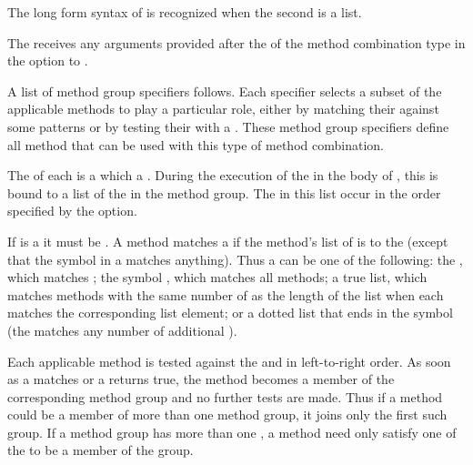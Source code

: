  
The long form syntax of  is recognized 
when the second  is a list.  
 
The  
receives any arguments provided after the  of the method
combination type in the  option to
.
 
A list of method group specifiers follows.  Each specifier selects a subset
of the applicable methods to play a particular role, either by matching
their  against some patterns or by testing their  with
a .   
These method group specifiers define all method 
that can be used with this type of method combination.
 
 
The  of each  is a 
which  a .
During the execution of
the  in the body of , this
 is bound to a list of the  in the method group.  The
 in this list occur in the order specified by the 
 option.
 
If  is a  it must be \misc{*}.  
A method matches
a  if the method's 
list of  is 
to the  (except that the symbol \misc{*} in a 
 matches anything).  Thus 
a  can be one of the
following:
 the , which matches ;
 the symbol \misc{*}, which matches all methods;
 a true list, which matches methods with the same number of  
   as the length of the list when each  matches 
   the corresponding list element; or
 a dotted list that ends in the symbol \misc{*} 
   (the \misc{*} matches any number of additional ).
 
 
Each applicable method is tested against the  and
 in left-to-right order.  
As soon as a  matches
or a  returns true, the method becomes a member of the
corresponding method group and no further tests are made.  Thus if a method
could be a member of more than one method group, it joins only the first
such group.  If a method group has more than one 
, a
method need only satisfy one of the  to be a member of
the group.
 
